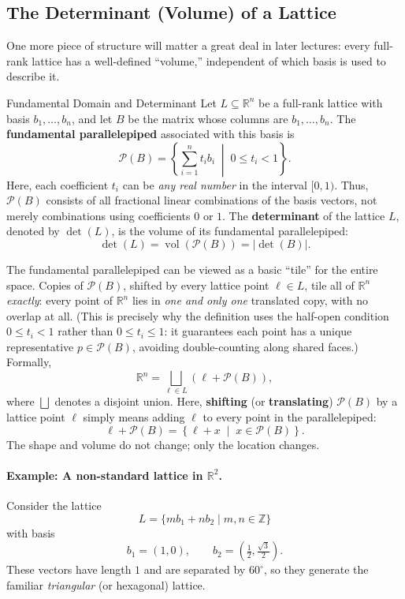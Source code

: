 \subsection{The Determinant (Volume) of a Lattice}
\label{sec:L1:the-determinant-volume-of-a-lattice}
One more piece of structure will matter a great deal in later lectures:
every full-rank lattice has a well-defined ``volume,'' independent of
which basis is used to describe it.
\begin{defbox}{Fundamental Domain and Determinant}
Let $L \subseteq \mathbb{R}^n$ be a full-rank lattice with basis
$b_1,\ldots,b_n$, and let $B$ be the matrix whose columns are
$b_1,\ldots,b_n$. The \textbf{fundamental parallelepiped} associated
with this basis is
\[
\mathcal{P}(B)
=
\left\{
\sum_{i=1}^n t_i b_i
\;\middle|\;
0 \leq t_i < 1
\right\}.
\]
Here, each coefficient $t_i$ can be \emph{any real number} in the
interval $[0,1)$. Thus, $\mathcal{P}(B)$ consists of all fractional
linear combinations of the basis vectors, not merely combinations
using coefficients $0$ or $1$.
The \textbf{determinant} of the lattice $L$, denoted by $\det(L)$, is
the volume of its fundamental parallelepiped:
\[
\det(L)
=
\operatorname{vol}(\mathcal{P}(B))
=
|\det(B)|.
\]
\end{defbox}
The fundamental parallelepiped can be viewed as a basic ``tile'' for
the entire space. Copies of $\mathcal{P}(B)$, shifted by every lattice
point $\ell\in L$, tile all of $\mathbb{R}^n$ \emph{exactly}: every
point of $\mathbb{R}^n$ lies in \emph{one and only one} translated
copy, with no overlap at all. (This is precisely why the definition
uses the half-open condition $0 \le t_i < 1$ rather than
$0 \le t_i \le 1$: it guarantees each point has a unique
representative $p \in \mathcal{P}(B)$, avoiding double-counting along
shared faces.) Formally,
\[
\mathbb{R}^n
=
\bigsqcup_{\ell\in L}
\left(\ell+\mathcal{P}(B)\right),
\]
where $\bigsqcup$ denotes a disjoint union.
Here, \textbf{shifting} (or \textbf{translating}) $\mathcal{P}(B)$ by
a lattice point $\ell$ simply means adding $\ell$ to every point in
the parallelepiped:
\[
\ell+\mathcal{P}(B)
=
\left\{
\ell+x
\;\middle|\;
x\in\mathcal{P}(B)
\right\}.
\]
The shape and volume do not change; only the location changes.
\medskip
\noindent



\paragraph{Example: A non-standard lattice in $\mathbb{R}^2$.}
Consider the lattice
\[
L = \{ m b_1 + n b_2 \mid m,n \in \mathbb{Z} \}
\]
with basis
\[
b_1 = (1,0), \qquad b_2 = \left(\tfrac12, \tfrac{\sqrt{3}}{2}\right).
\]
These vectors have length $1$ and are separated by $60^\circ$, so they generate the familiar \emph{triangular} (or hexagonal) lattice.

